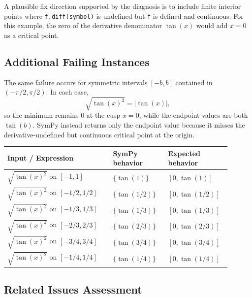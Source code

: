 \documentclass[11pt]{article}
\begin{document}
A plausible fix direction supported by the diagnosis is to include finite
interior points where \texttt{f.diff(symbol)} is undefined but \texttt{f} is
defined and continuous. For this example, the zero of the derivative denominator
\(\tan(x)\) would add \(x=0\) as a critical point.

\subsection{Additional Failing Instances}

The same failure occurs for symmetric intervals \([-b,b]\) contained in
\((-\pi/2,\pi/2)\). In each case,
\[
  \sqrt{\tan(x)^2}=|\tan(x)|,
\]
so the minimum remains \(0\) at the cusp \(x=0\), while the endpoint values are
both \(\tan(b)\). SymPy instead returns only the endpoint value because it misses
the derivative-undefined but continuous critical point at the origin.

\begin{center}
\small
\renewcommand{\arraystretch}{1.3}
\begin{tabular}{@{}>{\raggedright\arraybackslash}p{0.44\linewidth}>{\raggedright\arraybackslash}p{0.23\linewidth}>{\raggedright\arraybackslash}p{0.23\linewidth}@{}}
\toprule
\textbf{Input / Expression} & \textbf{SymPy behavior} & \textbf{Expected behavior} \\
\midrule
\(\sqrt{\tan(x)^2}\) on \([-1,1]\) & \(\{\tan(1)\}\) & \([0,\tan(1)]\) \\
\(\sqrt{\tan(x)^2}\) on \([-1/2,1/2]\) & \(\{\tan(1/2)\}\) & \([0,\tan(1/2)]\) \\
\(\sqrt{\tan(x)^2}\) on \([-1/3,1/3]\) & \(\{\tan(1/3)\}\) & \([0,\tan(1/3)]\) \\
\(\sqrt{\tan(x)^2}\) on \([-2/3,2/3]\) & \(\{\tan(2/3)\}\) & \([0,\tan(2/3)]\) \\
\(\sqrt{\tan(x)^2}\) on \([-3/4,3/4]\) & \(\{\tan(3/4)\}\) & \([0,\tan(3/4)]\) \\
\(\sqrt{\tan(x)^2}\) on \([-1/4,1/4]\) & \(\{\tan(1/4)\}\) & \([0,\tan(1/4)]\) \\
\bottomrule
\end{tabular}
\end{center}

\subsection{Related Issues Assessment}
\end{document}
